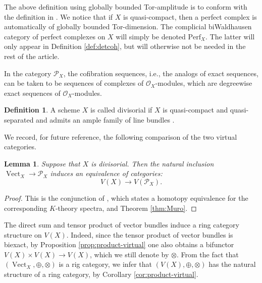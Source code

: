 \documentclass[11pt]{article}
\newcommand{\ie}{i.e.,\xspace}
\theoremstyle{plain}
\newtheorem{lemma}[theorem]{Lemma}
\theoremstyle{definition}
\newtheorem{definition}[theorem]{Definition}
\newcommand{\Ocal}{\mathcal O}
\newcommand{\Pcal}{\mathcal P}
\DeclareMathOperator{\Vect}{Vect}
\begin{document}
The above definition using globally bounded Tor-amplitude is to conform with the definition in \cite[Def.\,3.1]{ThomasonTrobaugh}. We notice that if $X$ is quasi-compact, then a perfect complex is automatically of globally bounded Tor-dimension. The complicial biWaldhausen category of perfect complexes on $X$ will simply be denoted $\mathrm{Perf}_{X}$. The latter will only appear in Definition \ref{def:detcoh}, but will otherwise not be needed in the rest of the article.

In the category $\Pcal_X$, the cofibration sequences, \ie the analogs of exact sequences, can be taken to be sequences of complexes of $\Ocal_X$-modules, which are degreewise exact sequences of $\Ocal_X$-modules.

\begin{definition}\label{def:divisorial}
A scheme $X$ is called divisorial if $X$ is quasi-compact and quasi-separated and admits an ample family of line bundles \cite[Exp.\,II, Déf.\,2.2.4]{SGA6}.
\end{definition}

We record, for future reference, the following comparison of the two virtual categories.
\begin{lemma}\label{lemma:divisorial}
Suppose that $X$ is divisorial. Then the natural inclusion $\Vect_X \to \Pcal_X$ induces an equivalence of categories:
\begin{displaymath}
V(X) \to V(\Pcal_X).
\end{displaymath}
\end{lemma}
\begin{proof}
This is the conjunction of \cite[Cor.\,3.9 \& Prop.\,3.10]{ThomasonTrobaugh}, which states a homotopy equivalence for the corresponding $K$-theory spectra, and Theorem \ref{thm:Muro}.
\end{proof}

The direct sum and tensor product of vector bundles induce a ring category structure on $V(X)$. Indeed, since the tensor product of vector bundles is biexact, by Proposition \ref{prop:product-virtual} one also obtains a bifunctor $V(X) \times V(X)\to V(X)$, which we still denote by $\otimes$. From the fact that $(\Vect_{X},\oplus,\otimes)$ is a rig category, we infer that $(V(X),\oplus,\otimes)$ has the natural structure of a ring category, by Corollary \ref{cor:product-virtual}.
\end{document}
